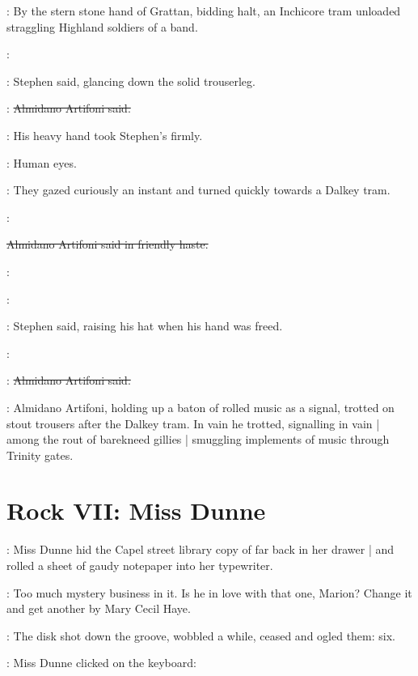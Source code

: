:
By the stern stone hand of Grattan,
bidding halt,
an Inchicore tram unloaded straggling Highland soldiers of a band.

\Stephen:

:
Stephen said,
glancing down the solid trouserleg.

\artifoni:
\sout{Almidano Artifoni said.}

:
His heavy hand took Stephen's firmly.

\StephenInt:
Human eyes.

:
They gazed curiously an instant
and turned quickly towards a Dalkey tram.

\artifoni:

\sout{Almidano Artifoni said in friendly haste.}

\artifoni:

\Stephen:

:
Stephen said,%
raising his hat when his hand was freed.

\Stephen:

\artifoni:
\sout{Almidano Artifoni said.}

:
Almidano Artifoni,
holding up a baton of rolled music as a signal,
trotted on stout trousers after the Dalkey tram.
In vain he trotted,
signalling in vain |
among the rout of barekneed gillies |
smuggling implements of music through Trinity gates.


\section*{Rock VII: Miss Dunne}


:
Miss Dunne hid the Capel street library copy
of  far back in her drawer |
and rolled a sheet of gaudy notepaper into her typewriter.%

\dunneint:
Too much mystery business in it.
Is he in love with that one, Marion?
Change it and get another by Mary Cecil Haye.
 
\begin{interject}
    :
    The disk shot down the groove,
    wobbled a while,
    ceased and ogled them: six.
\end{interject}

:
Miss Dunne clicked on the keyboard:


